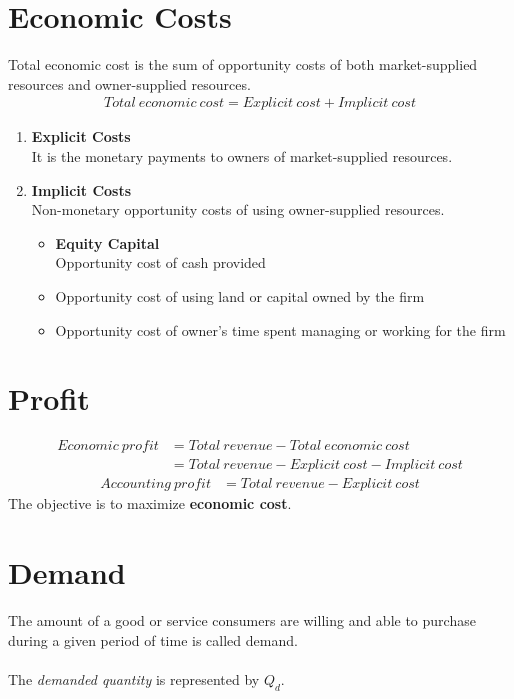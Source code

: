 \documentclass[oneside]{book}
\begin{document}
\section{Economic Costs}
Total economic cost is the sum of opportunity costs of both market-supplied resources and owner-supplied resources.
\begin{align*}
	Total\ economic\ cost = Explicit\ cost + Implicit\ cost
\end{align*}
\begin{enumerate}
	\item \textbf{Explicit Costs}\\
	      It is the monetary payments to owners of market-supplied resources.
	\item \textbf{Implicit Costs}\\
	      Non-monetary opportunity costs of using owner-supplied resources.
	      \begin{itemize}
		      \item \textbf{Equity Capital}\\Opportunity cost of cash provided
		      \item Opportunity cost of using land or capital owned by the firm
		      \item Opportunity cost of owner's time spent managing or working for the firm
	      \end{itemize}
\end{enumerate}

\section{Profit}
\begin{align*}
	Economic\ profit & = Total\ revenue - Total\ economic\ cost           \\
	                 & = Total\ revenue - Explicit\ cost - Implicit\ cost
\end{align*}
\begin{align*}
	Accounting\ profit & = Total\ revenue - Explicit\ cost
\end{align*}
The objective is to maximize \textbf{economic cost}.

\section{Demand}
The amount of a good or service consumers are willing and able to purchase during a given period of time is called demand.
\\\\
The \textit{demanded quantity} is represented by \(Q_d\).
\end{document}
